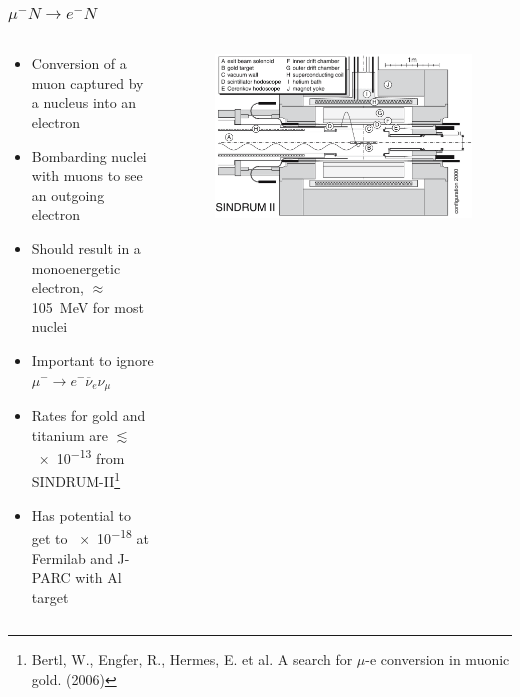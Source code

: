 \documentclass[11pt]{beamer}
\begin{document}
\begin{frame}
    \frametitle{$\mu^- N \rightarrow e^- N$}

    \begin{columns}[c]
        \begin{column}{0.6\textwidth}
            \begin{itemize}
                \item Conversion of a muon captured by a nucleus into an electron
                \item Bombarding nuclei with muons to see an outgoing electron
                \item Should result in a monoenergetic electron, $\approx$\SI{105}{\mega\electronvolt} for most nuclei
                \item Important to ignore $\mu^-\rightarrow e^- \overline{\nu}_e \nu_\mu$
                \item Rates for gold and titanium are $\lesssim$ \num{e-13} from SINDRUM-II\footnote[frame]{Bertl, W., Engfer, R., Hermes, E. et al. A search for $\mu$-e conversion in muonic gold. (2006)}
                \item Has potential to get to \num{e-18} at Fermilab and J-PARC with Al target
            \end{itemize}
        \end{column}
        \begin{column}{0.4\textwidth}
            \begin{figure}[h]
                \begin{center}
                    \includegraphics[width=\textwidth]{SINDRUMII.png}
                \end{center}
            \end{figure}
        \end{column}
    \end{columns}
    

\end{frame}
\end{document}
